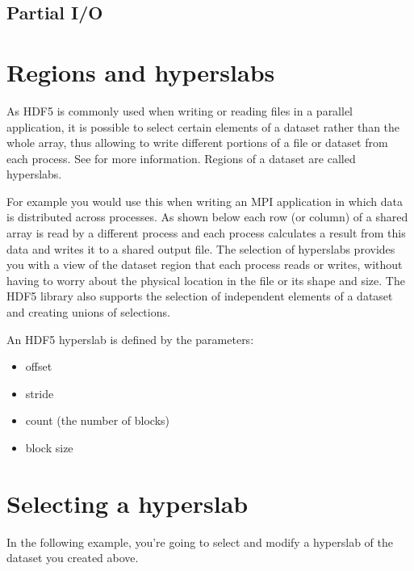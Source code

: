 \documentclass[letterpaper,10pt,english]{sphinxmanual}
\begin{document}
\section{Partial I/O}
\label{\detokenize{index:partial-i-o}}

\chapter{Regions and hyperslabs}
\label{\detokenize{index:regions-and-hyperslabs}}
\sphinxAtStartPar
As HDF5 is commonly used when writing or reading files in a parallel application,
it is possible to select certain elements of a dataset rather than the whole array,
thus allowing to write different portions of a file or dataset from each process.
See  for more information.
Regions of a dataset are called hyperslabs.

\noindent{}

\sphinxAtStartPar
For example you would use this when writing an MPI application in which data is distributed across processes.
As shown below each row (or column) of a shared array is read by a different process
and each process calculates a result from this data and writes it to a shared output file.
The selection of hyperslabs provides you with a view of the dataset region that each process reads or writes,
without having to worry about the physical location in the file or its shape and size.
The HDF5 library also supports the selection of independent elements of a dataset
and creating unions of selections.

\sphinxAtStartPar
An HDF5 hyperslab is defined by the parameters:
\begin{itemize}
\item {} 
\sphinxAtStartPar
offset

\item {} 
\sphinxAtStartPar
stride

\item {} 
\sphinxAtStartPar
count (the number of blocks)

\item {} 
\sphinxAtStartPar
block size

\end{itemize}

\noindent{}


\chapter{Selecting a hyperslab}
\label{\detokenize{index:selecting-a-hyperslab}}
\sphinxAtStartPar
In the following example, you’re going to select and modify a hyperslab of the dataset you created above.
\end{document}
